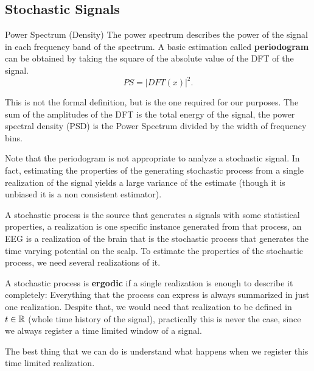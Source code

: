 \documentclass[10pt, letterpaper]{report}
\begin{document}
\subsection{Stochastic Signals}
\begin{boxdefinition}{Power Spectrum (Density)}{}
     The power spectrum describes the power of the signal in each frequency band of the spectrum. A basic
estimation called \textbf{periodogram}  can be obtained by taking the square of the absolute value of the DFT of the
signal.\begin{equation}
     PS=|DFT(x)|^2.
\end{equation}
\end{boxdefinition}
This is not the formal definition, but is the one required for our purposes. The sum of the amplitudes of the DFT is the total energy of the signal, the power spectral density (PSD) is the Power Spectrum divided by the width of frequency bins.

Note that the periodogram is not appropriate to analyze a stochastic signal. In fact, estimating the properties
of the generating stochastic process from a single realization of the signal yields a large variance of the
estimate (though it is unbiased it is a non consistent estimator).\bigskip

A stochastic process is the source that generates a signals with some statistical properties, a realization is one specific instance generated from that process, an EEG is a realization of the brain that is the stochastic process that generates the time varying potential on the scalp. To estimate the properties of the stochastic process, we need several realizations of it.

A stochastic process is \textbf{ergodic} if a single realization is enough to describe it completely: Everything that the process can express is always summarized in just one realization. Despite that, we would need that realization to be defined in $t\in{\mathbb R}$ (whole time history of the signal), practically this is never the case, since we always register a time limited window of a signal.

The best thing that we can do is understand what happens when we register this time limited realization.\bigskip 
\end{document}
